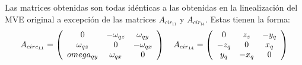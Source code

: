 Las matrices obtenidas son todas id\'enticas a las obtenidas en la linealizaci\'on del MVE original a excepci\'on de las matrices $A_{cir_{11}}$ y $A_{cir_{14}}$. Estas tienen la forma:
\begin{equation}
A_{circ_{11}}=\left(\begin{array}{ccc}
0 & -\omega_{qz} & \omega_{qy} \\
\omega_{qz} & 0 & -\omega_{qx}\\
\-omega_{qy} & \omega_{qx} &0\\

\end{array}\right) \quad 
A_{cir_{14}}=\left(\begin{array}{ccc}
0 & z_{z} & -y_{q} \\
-z_{q} & 0 & x_{q}\\
y_{q} & -x_{q} &0\\
\end{array}\right)
\end{equation}

%